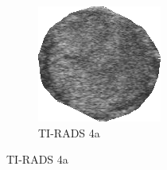 \documentclass[12pt]{article}
\begin{document}
\begin{figure}[t]
\begin{subfigure}[t]{.3\textwidth}
  \centering
  \includegraphics[width=.6\linewidth]{images/t_4a_crop.png}
  \caption{TI-RADS 4a}
  \label{fig:t4ac}
\end{subfigure}
\hfill


\end{figure}
\end{document}
